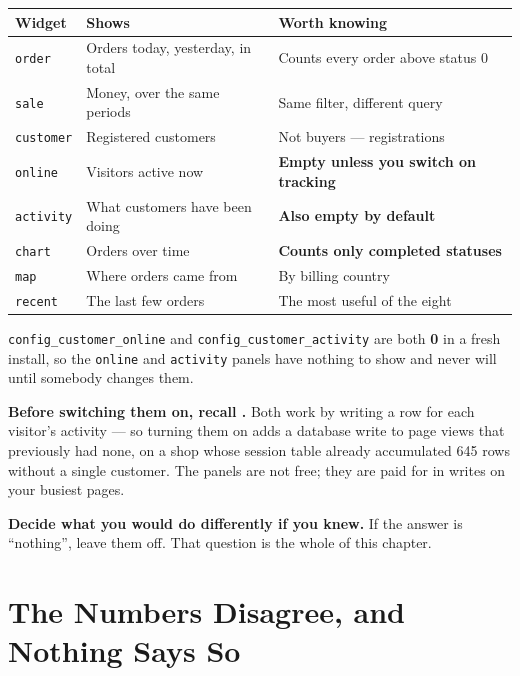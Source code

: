 \begin{longtable}{@{}L{2.4cm}L{5.6cm}L{6.4cm}@{}}
\toprule
{}
\textbf{Widget} & \textbf{Shows} & \textbf{Worth knowing} \\
\midrule
\endhead
\texttt{order} & Orders today, yesterday, in total & Counts every order above
status 0 \\
\texttt{sale} & Money, over the same periods & Same filter, different query \\
\texttt{customer} & Registered customers & Not buyers --- registrations \\
\texttt{online} & Visitors active now & \textbf{Empty unless you switch on
tracking} \\
\texttt{activity} & What customers have been doing & \textbf{Also empty by
default} \\
\texttt{chart} & Orders over time & \textbf{Counts only completed statuses} \\
\texttt{map} & Where orders came from & By billing country \\
\texttt{recent} & The last few orders & The most useful of the eight \\
\bottomrule
\end{longtable}

\begin{alertbox}
\texttt{config\_customer\_online} and \texttt{config\_customer\_activity} are
both \textbf{0} in a fresh install, so the \texttt{online} and
\texttt{activity} panels have nothing to show and never will until somebody
changes them.

\smallskip
\textbf{Before switching them on, recall .} Both work by writing
a row for each visitor's activity --- so turning them on adds a database write
to page views that previously had none, on a shop whose session table already
accumulated 645 rows without a single customer. The panels are not free; they
are paid for in writes on your busiest pages.

\smallskip
\textbf{Decide what you would do differently if you knew.} If the answer is
``nothing'', leave them off. That question is the whole of this chapter.
\end{alertbox}

\section{The Numbers Disagree, and Nothing Says So}

